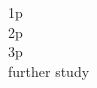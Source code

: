 \question[3]
\label{q:}

\begin{solution}
    \begin{description}
        \item[1p] %
        \item[2p] %
        \item[3p] %
        \item[further study] %
    \end{description}

\end{solution}
